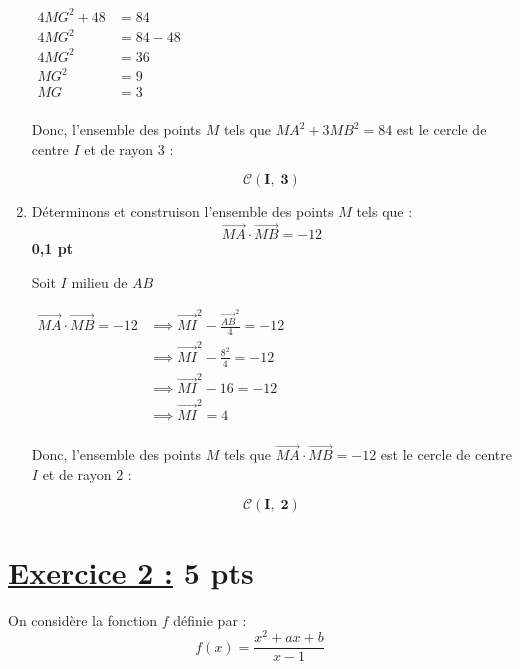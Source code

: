 \documentclass[12pt,a4paper]{article}
\begin{document}
\begin{enumerate}
		    \(
    \begin{aligned}
    		4MG^2+48 &= 84\\
        4MG^2 &= 84-48\\  
         4MG^2 &=36\\
         MG^2 &=9\\
         MG &=3\\
    \end{aligned}
    \)    
    
    Donc, l'ensemble des points \( M \) tels que \( MA^2 + 3MB^2 = 84 \) est le cercle de centre \( I \) et de rayon \( 3 \) :   
    		    \begin{resultbox}
            \[
                \mathbf{\mathscr{C}(I,\;3) }
            \]
					\end{resultbox} 
    
    \item Déterminons et construison l'ensemble des points \( M \) tels que :
    \[
    \overrightarrow{MA}\cdot\overrightarrow{MB} = -12
    \]
    \hfill \textbf{0{,}1 pt}

		Soit \(I\) milieu de \(AB\)  
		
		\(		
		\begin{aligned}
			\overrightarrow{MA} \cdot \overrightarrow{MB} = -12 &\implies \overrightarrow{MI}^{2}-\frac{\overrightarrow{AB}^{2}}{4} = -12\\
			&\implies \overrightarrow{MI}^{2}-\frac{8^{2}}{4} = -12\\
			&\implies \overrightarrow{MI}^{2}-16 = -12\\
			&\implies \overrightarrow{MI}^{2} = 4\\
		\end{aligned}
		\)  

Donc, l'ensemble des points \( M \) tels que \( \overrightarrow{MA} \cdot \overrightarrow{MB} = -12 \) est le cercle de centre \( I \) et de rayon \( 2 \) :   
    		    \begin{resultbox}
            \[
                \mathbf{\mathscr{C}(I,\;2) }
            \]
					\end{resultbox}  
\end{enumerate}

\section*{\underline{Exercice 2 :} 5 pts}

On considère la fonction \( f \) définie par :
\[
f(x) = \frac{x^2 + ax + b}{x - 1}
\]
\end{document}
